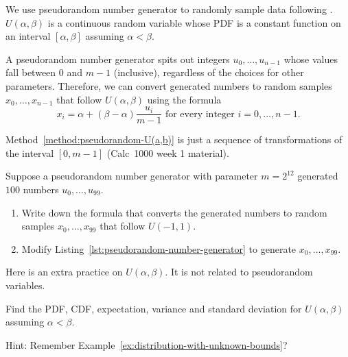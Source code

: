 \documentclass[../main.tex]{subfiles}
\begin{document}
\faStar{} We use pseudorandom number generator to randomly sample data following . \(U(\alpha,\beta)\) is a continuous random variable whose PDF is a constant function on an interval \([\alpha, \beta]\) assuming \(\alpha < \beta\).

\begin{method} \label{method:pseudorandom-U(a,b)}
  A pseudorandom number generator spits out integers \(u_{0}, \ldots, u_{n-1}\) whose values fall between \(0\) and \(m-1\) (inclusive), regardless of the choices for other parameters. Therefore, we can convert generated numbers to random samples \(x_{0}, \ldots, x_{n-1}\) that follow \(U(\alpha,\beta)\) using the formula
  \[
    x_{i} = \alpha + (\beta-\alpha) \frac{u_{i}}{m - 1} \text{ for every integer } i = 0, \ldots, n-1.
  \]
\end{method}

Method~\ref{method:pseudorandom-U(a,b)} is just a sequence of transformations of the interval \([0, m-1]\) (Calc~1000 week 1 material).

\blanks*
\clearpage

\begin{example}
  Suppose a pseudorandom number generator with parameter \(m = 2^{12}\) generated \(100\) numbers \(u_{0}, \ldots, u_{99}\).  
  \begin{enumerate}
    \item Write down the formula that converts the generated numbers to random samples \(x_{0}, \ldots, x_{99}\) that follow \(U(-1, 1)\). 
    \item Modify Listing~\ref{lst:pseudorandom-number-generator} to generate \(x_{0}, \ldots, x_{99}\).
  \end{enumerate}

\end{example}

\medskip
Here is an extra practice on \(U(\alpha,\beta)\). It is not related to pseudorandom variables.
\begin{example}
  Find the PDF, CDF, expectation, variance and standard deviation for \(U(\alpha, \beta)\) assuming \(\alpha < \beta\).

  {\footnotesize Hint: Remember Example~\ref{ex:distribution-with-unknown-bounds}?}

\end{example}
\end{document}
